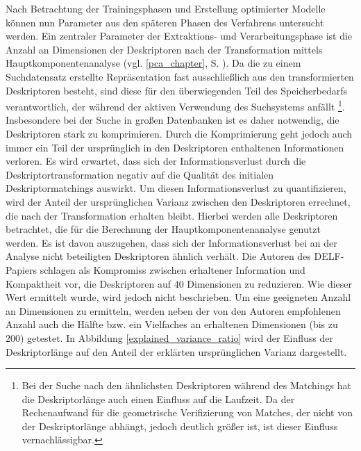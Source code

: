 Nach Betrachtung der Trainingsphasen und Erstellung optimierter Modelle können nun Parameter aus den späteren Phasen des Verfahrens untersucht werden.
Ein zentraler Parameter der Extraktions- und Verarbeitungsphase ist die Anzahl an Dimensionen der Deskriptoren nach der Transformation mittels Hauptkomponentenanalyse (vgl. \ref{pca_chapter}, S. \pageref{pca_chapter}). Da die zu einem Suchdatensatz erstellte Repräsentation fast ausschließlich aus den transformierten Deskriptoren besteht, sind diese für den überwiegenden Teil des Speicherbedarfs verantwortlich, der während der aktiven Verwendung des Suchsystems anfällt \footnote{Bei der Suche nach den ähnlichsten Deskriptoren während des Matchings hat die Deskriptorlänge auch einen Einfluss auf die Laufzeit. Da der Rechenaufwand für die geometrische Verifizierung von Matches, der nicht von der Deskriptorlänge abhängt, jedoch deutlich größer ist, ist dieser Einfluss vernachlässigbar.}. Insbesondere bei der Suche in großen Datenbanken ist es daher notwendig, die Deskriptoren stark zu komprimieren. Durch die Komprimierung geht jedoch auch immer ein Teil der ursprünglich in den Deskriptoren enthaltenen Informationen verloren. Es wird erwartet, dass sich der Informationsverlust durch die Deskriptortransformation negativ auf die Qualität des initialen Deskriptormatchings auswirkt. Um diesen Informationsverlust zu quantifizieren, wird der Anteil der ursprünglichen Varianz zwischen den Deskriptoren errechnet, die nach der Transformation erhalten bleibt. Hierbei werden alle Deskriptoren betrachtet, die für die Berechnung der Hauptkomponentenanalyse genutzt werden. Es ist davon auszugehen, dass sich der Informationsverlust bei an der Analyse nicht beteiligten Deskriptoren ähnlich verhält. Die Autoren des DELF-Papiers \cite{delf} schlagen als Kompromiss zwischen erhaltener Information und Kompaktheit vor, die Deskriptoren auf $40$ Dimensionen zu reduzieren. Wie dieser Wert ermittelt wurde, wird jedoch nicht beschrieben. Um eine geeigneten Anzahl an Dimensionen zu ermitteln, werden neben der von den Autoren empfohlenen Anzahl auch die Hälfte bzw. ein Vielfaches an erhaltenen Dimensionen (bis zu $200$) getestet. In Abbildung \ref{explained_variance_ratio} wird der Einfluss der Deskriptorlänge auf den Anteil der erklärten ursprünglichen Varianz dargestellt.
